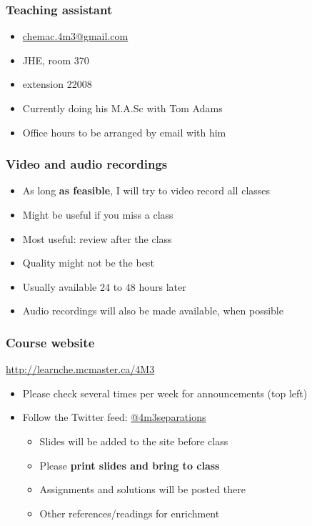 \begin{frame}\frametitle{Teaching assistant}
	{\color{myGreen}{Dominik Seepersad}}
	\begin{itemize}
		\item	\url{chemac.4m3@gmail.com}
		\item	JHE, room 370
		\item	extension 22008
		\item	Currently doing his M.A.Sc with Tom Adams
		\item	Office hours to be arranged by email with him
	\end{itemize}
\end{frame}

\begin{frame}\frametitle{Video and audio recordings}
	\begin{itemize}
		\item	As long \textbf{as feasible}, I will try to video record all classes
		\item	Might be useful if you miss a class
		\item	Most useful: review after the class
		\item	Quality might not be the best
		\item	Usually available 24 to 48 hours later
		\item	Audio recordings will also be made available, when possible
	\end{itemize}
\end{frame}

\begin{frame}\frametitle{Course website}

	\begin{exampleblock}{}
		\centering
		\href{http://learnche.mcmaster.ca/4M3}{http://learnche.mcmaster.ca/4M3}
	\end{exampleblock}
	\begin{itemize}
		\item	Please check several times per week for announcements {\tiny (top left)}
		\item	Follow the Twitter feed: \href{https://twitter.com/4m3separations}{@4m3separations}
		
		\vspace{12pt}
		\begin{itemize}
			\item	Slides will be added to the site before class
			\item	Please \textbf{print slides and bring to class}
			\item	Assignments and solutions will be posted there
			\item	Other references/readings for enrichment
		\end{itemize}
	\end{itemize}
\end{frame}

